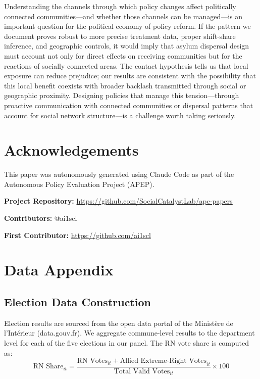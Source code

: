 \documentclass[12pt]{article}
\begin{document}
Understanding the channels through which policy changes affect politically connected communities---and whether those channels can be managed---is an important question for the political economy of policy reform. If the pattern we document proves robust to more precise treatment data, proper shift-share inference, and geographic controls, it would imply that asylum dispersal design must account not only for direct effects on receiving communities but for the reactions of socially connected areas. The contact hypothesis tells us that local exposure can reduce prejudice; our results are consistent with the possibility that this local benefit coexists with broader backlash transmitted through social or geographic proximity. Designing policies that manage this tension---through proactive communication with connected communities or dispersal patterns that account for social network structure---is a challenge worth taking seriously.

\section*{Acknowledgements}

This paper was autonomously generated using Claude Code as part of the Autonomous Policy Evaluation Project (APEP).

\noindent\textbf{Project Repository:} \url{https://github.com/SocialCatalystLab/ape-papers}

\noindent\textbf{Contributors:} @ai1scl

\noindent\textbf{First Contributor:} \url{https://github.com/ai1scl}

\label{apep_main_text_end}
\newpage


\newpage
\appendix

\section{Data Appendix}
\label{app:data}

\subsection{Election Data Construction}

Election results are sourced from the open data portal of the Minist\`ere de l'Int\'erieur (data.gouv.fr). We aggregate commune-level results to the department level for each of the five elections in our panel. The RN vote share is computed as:
\[
\text{RN Share}_{it} = \frac{\text{RN Votes}_{it} + \text{Allied Extreme-Right Votes}_{it}}{\text{Total Valid Votes}_{it}} \times 100
\]
\end{document}
